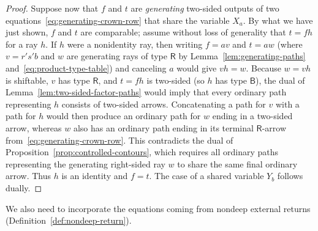 \begin{proof}
Suppose now that $f$ and $t$ are \emph{generating} two-sided outputs of two equations~\eqref{eq:generating-crown-row} that share the variable $X_a$. By what we have just shown, $f$ and $t$ are comparable; assume without loss of generality that $t=fh$ for a ray $h$. If $h$ were a nonidentity ray, then writing $f=av$ and $t=aw$ (where $v=r's'b$ and $w$ are generating rays of type $\mathsf R$ by Lemma~\ref{lem:generating-paths} and~\eqref{eq:product-type-table}) and canceling $a$ would give $vh=w$. Because $w=vh$ is shiftable, $v$ has type $\mathsf R$, and $t=fh$ is two-sided (so $h$ has type $\mathsf B$), the dual of Lemma~\ref{lem:two-sided-factor-paths} would imply that every ordinary path representing $h$ consists of two-sided arrows. Concatenating a path for $v$ with a path for $h$ would then produce an ordinary path for $w$ ending in a two-sided arrow, whereas $w$ also has an ordinary path ending in its terminal $\mathsf R$-arrow from~\eqref{eq:generating-crown-row}. This contradicts the dual of Proposition~\ref{prop:controlled-contours}, which requires all ordinary paths representing the generating right-sided ray $w$ to share the same final ordinary arrow. Thus $h$ is an identity and $f=t$. The case of a shared variable $Y_b$ follows dually.
\end{proof}

We also need to incorporate the equations coming from nondeep external returns (Definition~\ref{def:nondeep-return}).

